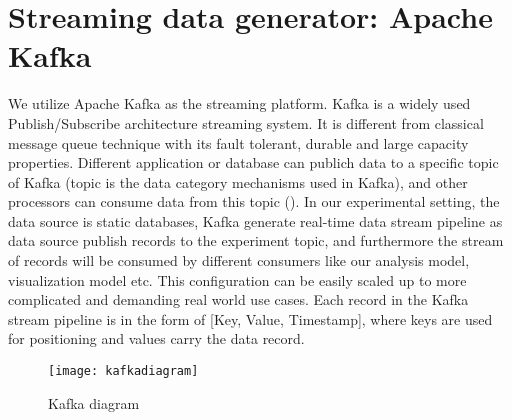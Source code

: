 \section{Streaming data generator: Apache Kafka}
\label{sec:Streaming data generator: Apache Kafka}

We utilize Apache Kafka as the streaming platform. Kafka is a widely used Publish/Subscribe architecture streaming system. It is different from classical message queue technique with its fault tolerant, durable and large capacity properties. Different application or database can publich data to a specific topic of Kafka (topic is the data category mechanisms used in Kafka), and other processors can consume data from this topic (). In our experimental setting, the data source is static databases, Kafka generate real-time data stream pipeline as data source publish records to the experiment topic, and furthermore the stream of records will be consumed by different consumers like our analysis model, visualization model etc. This configuration can be easily scaled up to more complicated and demanding real world use cases. Each record in the Kafka stream pipeline is in the form of [Key, Value, Timestamp], where keys are used for positioning and values carry the data record.

\begin{figure}[h]
\centering
\texttt{[image: kafkadiagram]}
\caption[Kafka diagram]{Kafka diagram\footnotemark}
\label{fig:kafkadiagram}
\end{figure}









